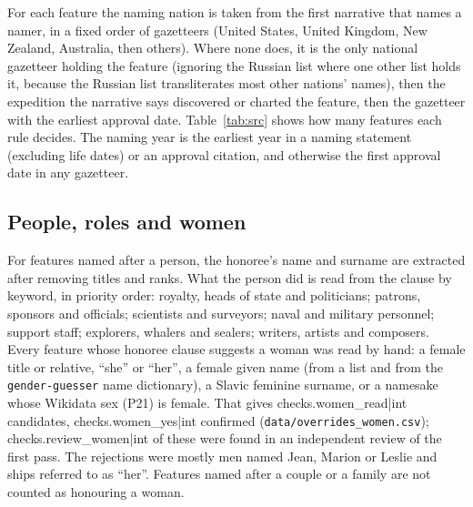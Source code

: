 \documentclass[11pt,a4paper]{article}
\begin{document}
For each feature the naming nation is taken from the first narrative that names a namer, in a fixed order of gazetteers (United States, United Kingdom, New Zealand, Australia, then others). Where none does, it is the only national gazetteer holding the feature (ignoring the Russian list where one other list holds it, because the Russian list transliterates most other nations' names), then the expedition the narrative says discovered or charted the feature, then the gazetteer with the earliest approval date. Table~\ref{tab:src} shows how many features each rule decides. The naming year is the earliest year in a naming statement (excluding life dates) or an approval citation, and otherwise the first approval date in any gazetteer.

\subsection{People, roles and women}
For features named after a person, the honoree's name and surname are extracted after removing titles and ranks. What the person did is read from the clause by keyword, in priority order: royalty, heads of state and politicians; patrons, sponsors and officials; scientists and surveyors; naval and military personnel; support staff; explorers, whalers and sealers; writers, artists and composers. Every feature whose honoree clause suggests a woman was read by hand: a female title or relative, ``she'' or ``her'', a female given name (from a list and from the \texttt{gender-guesser} name dictionary), a Slavic feminine surname, or a namesake whose Wikidata sex (P21) is female. That gives {{checks.women_read|int}} candidates, {{checks.women_yes|int}} confirmed (\texttt{data/overrides\_women.csv}); {{checks.review_women|int}} of these were found in an independent review of the first pass. The rejections were mostly men named Jean, Marion or Leslie and ships referred to as ``her''. Features named after a couple or a family are not counted as honouring a woman.
\end{document}
